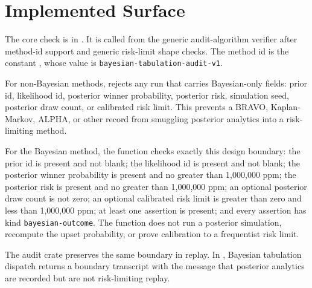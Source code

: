 \section{Implemented Surface}

The core check is  in
. It is called from the generic
audit-algorithm verifier after method-id support and generic risk-limit shape
checks. The method id is the constant
, whose value is
\texttt{bayesian-tabulation-audit-v1}.

For non-Bayesian methods,  rejects any run
that carries Bayesian-only fields: prior id, likelihood id, posterior winner
probability, posterior risk, simulation seed, posterior draw count, or
calibrated risk limit. This prevents a BRAVO, Kaplan-Markov, ALPHA, or other
record from smuggling posterior analytics into a risk-limiting method.

For the Bayesian method, the function checks exactly this design boundary: the
prior id is present and not blank; the likelihood id is present and not blank;
the posterior winner probability is present and no greater than 1,000,000 ppm;
the posterior risk is present and no greater than 1,000,000 ppm; an optional
posterior draw count is not zero; an optional calibrated risk limit is greater
than zero and less than 1,000,000 ppm; at least one assertion is present; and
every assertion has kind \texttt{bayesian-outcome}. The function does not run a
posterior simulation, recompute the upset probability, or prove calibration to
a frequentist risk limit.

The audit crate preserves the same boundary in replay. In
, Bayesian tabulation dispatch returns a
boundary transcript with the message that posterior analytics are recorded but
are not risk-limiting replay.

